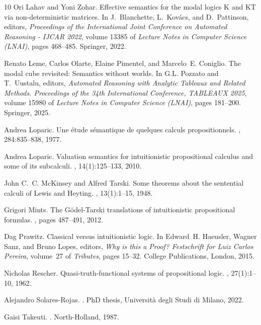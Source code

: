 \documentclass[12pt]{article}
\begin{document}
\begin{thebibliography}{10}
Ori Lahav and Yoni Zohar.
\newblock Effective semantics for the modal logics {K} and {KT} via
  non-deterministic matrices.
\newblock In J.~Blanchette, L.~Kov\'acs, and D.~Pattinson, editors, {\em
  Proceedings of the International Joint Conference on Automated Reasoning -
  IJCAR 2022}, volume 13385 of {\em Lecture Notes in Computer Science (LNAI)},
  pages 468--485. Springer, 2022.

Renato Leme, Carlos Olarte, Elaine Pimentel, and Marcelo~E. Coniglio.
\newblock The modal cube revisited: {S}emantics without worlds.
\newblock In G.L. Pozzato and T.~Uustalu, editors, {\em Automated Reasoning
  with Analytic Tableaux and Related Methods. Proceedings of the 34th
  International Conference, TABLEAUX 2025}, volume 15980 of {\em Lecture Notes
  in Computer Science (LNAI)}, pages 181--200. Springer, 2025.

Andrea Loparic.
\newblock Une \'etude s\'emantique de quelques calculs propositionnels.
,
  284:835--838, 1977.

Andrea Loparic.
\newblock Valuation semantics for intuitionistic propositional calculus and
  some of its subcalculi.
, 14(1):125--133, 2010.

John C.~C. McKinsey and Alfred Tarski.
\newblock Some theorems about the sentential calculi of {L}ewis and {H}eyting.
, 13(1):1--15, 1948.

Grigori Mints.
\newblock The {G{\"o}del-Tarski} translations of intuitionistic propositional
  formulas.
, pages 487--491, 2012.

Dag Prawitz.
\newblock Classical versus intuitionistic logic.
\newblock In Edward~H. Haeusler, Wagner Sanz, and Bruno Lopes, editors, {\em
  Why is this a Proof? Festschrift for Luiz Carlos Pereira}, volume~27 of {\em
  Tributes}, pages 15--32. College Publications, London, 2015.

Nicholas Rescher.
\newblock Quasi-truth-functional systems of propositional logic.
, 27(1):1--10, 1962.

Alejandro Solares-Rojas.
.
\newblock PhD thesis, Universit\`a degli Studi di Milano, 2022.

Gaisi Takeuti.
.
\newblock North-Holland, 1987.

\end{thebibliography}
\end{document}
